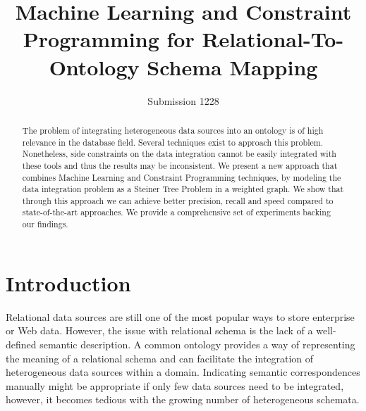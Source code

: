 \documentclass[letterpaper]{article} %
\newcommand{\ignore}[1]{}
\begin{document}
%
\title{Machine Learning and Constraint Programming for Relational-To-Ontology Schema Mapping }
\author{Submission 1228}
\maketitle
\begin{abstract}
The problem of integrating heterogeneous data sources into an ontology is of high 
relevance in the database field. Several techniques exist to approach this 
problem. Nonetheless, side constraints on the data integration cannot be easily 
integrated with these tools and thus the results may be inconsistent. We 
present a new approach that combines Machine Learning and 
Constraint Programming techniques, by modeling the data integration problem as 
a Steiner Tree Problem in a weighted graph. We show that through this approach 
we can achieve better precision, recall and speed compared to state-of-the-art 
approaches. We provide a comprehensive set of experiments backing our 
findings.
\end{abstract}

\section{Introduction}
\ignore{
The problem of integrating heterogeneous data sources is a long standing issue 
in the database research field and is of high relevance in many real-world 
domains (see e.g. 
\cite{Rahm:2001:SAA:767149.767154,Dhamankar:imap,Taheriyan2013}).
A common approach to tackle this problem is to design a global model and to
construct source descriptions which specify mappings between the sources and
the global model \cite{doan2012principles}.

In our case, we would like this global model to account not only for structural properties of the original data sources, but also to include the semantics, which is usually implicitly present in the sources.
In other words, we want to build a semantic model which describes the data sources in terms of concepts and relationships defined by an ontology \cite{taheriyan2016learning}.
Henceforth, we focus on a specific data integration problem: automatically mapping a new relational data source onto a user provided ontology.
}
Relational data sources are still one of the most popular ways to store enterprise or Web data. However, the issue with relational schema is the lack of a well-defined semantic description.
A common ontology provides a way of representing the meaning of a relational schema and can facilitate the integration of heterogeneous data sources within a domain.
Indicating semantic correspondences manually might be appropriate if only few data sources need to be integrated, however, it becomes tedious with the growing number of heterogeneous schemata.
\end{document}
